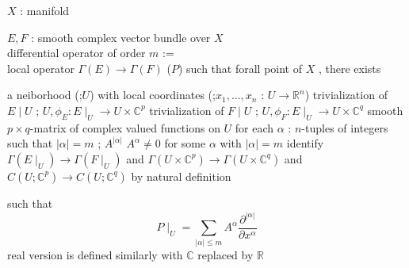 \begin{When}
\itemwhen
  \Fix \(X\) : manifold
\end{When}

\begin{Definition}
\itemdefi
  \For \(E , F\) : smooth complex vector bundle over \(X\) \\
  \Define differential operator of order \(m\) := \\
  local operator \(\Gamma(E) \to \Gamma(F)\) (\(P\)) such that forall point of \(X\) , there exists
  \begin{itemize}
    \itemenum a neiborhood (;\(U\)) with local coordinates (;\(x_1 , \ldots , x_n\) : \(U \to \mathbb{R}^n\))
    \itemenum trivialization of \(E \mid U\) ; \(U , \phi_E : E \mid_U \to U \times \mathbb{C}^p\)
    \itemenum trivialization of \(F \mid U\) ; \(U , \phi_F : E \mid_U \to U \times \mathbb{C}^q\)
    \itemenum smooth \(p \times q\)-matrix of complex valued functions on \(U\) for each \(\alpha\) : \(n\)-tuples of integers such that \(| \alpha | = m\) ; \(A^{|\alpha|}\)
    \itemwith \(A^\alpha \not = 0\) for some \(\alpha\) with \(| \alpha | = m\)
    \itemwith identify \(\Gamma(E \mid _U) \to \Gamma(F \mid _U)\) and \(\Gamma(U \times \mathbb{C}^p) \to \Gamma(U \times \mathbb{C}^q)\) and \(C(U;\mathbb{C}^p) \to C(U;\mathbb{C}^q)\) by natural definition
  \end{itemize}
  such that
  \[P \mid_U = \sum_{|\alpha| \leq m} A^{\alpha} \frac{\partial^{|\alpha|}}{\partial x^{\alpha}}\]
\itemdefi
  real version is defined similarly with \(\mathbb{C}\) replaced by \(\mathbb{R}\)
\end{Definition}

